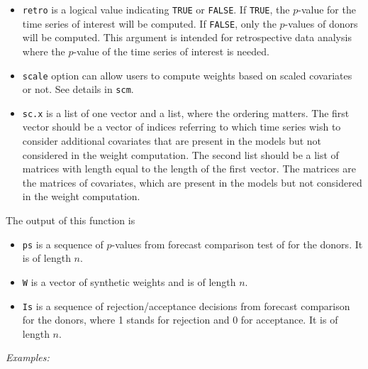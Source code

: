 \documentclass[12pt]{article}
\begin{document}
\begin{itemize}
	\item \texttt{retro} is a logical value indicating \texttt{TRUE} or \texttt{FALSE}. If  \texttt{TRUE}, the $p$-value for the time series of interest will be computed. If  \texttt{FALSE}, only the $p$-values of donors will be computed. This argument is intended for retrospective data analysis where the $p$-value of the time series of interest is needed.
	\item \texttt{scale} option can allow users to compute weights based on scaled covariates or not. See details in \texttt{scm}.
	\item \texttt{sc.x} is a list of one vector and a list, where the ordering matters. The first vector should be a vector of indices referring to which time series wish to consider additional covariates that are present in the models but not considered in the weight computation. The second list should be a list of matrices with length equal to the length of the first vector. The matrices are the matrices of covariates, which are present in the models but not considered in the weight computation.
\end{itemize}
 
 The output of this function is
 \begin{itemize}
 	\item \texttt{ps} is a sequence of $p$-values from forecast comparison test of   for the donors. It is of length $n$.
 	\item \texttt{W} is a vector of synthetic weights and is of length $n$.
 	\item  \texttt{Is} is a sequence of rejection/acceptance decisions from forecast comparison for the donors, where 1 stands for rejection and 0 for acceptance. It is of length $n$.
 \end{itemize}
 
 
 \emph{Examples:}
 
\end{document}

